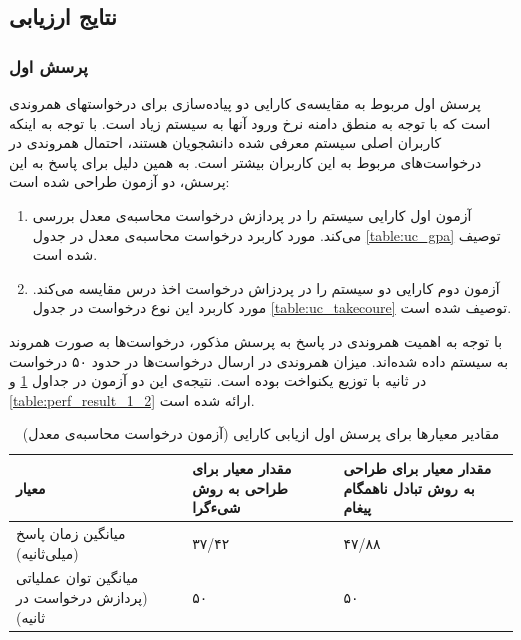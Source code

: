 \subsection{نتایج ارزیابی}
\subsubsection{پرسش اول}
پرسش اول مربوط به مقایسه‌ی  کارایی دو پیاده‌سازی برای درخواستهای همروندی است که با توجه به منطق دامنه نرخ ورود آنها به سیستم زیاد است. با توجه به اینکه کاربران اصلی سیستم معرفی شده دانشجویان هستند، احتمال همروندی در درخواست‌های مربوط به این کاربران بیشتر است. به همین دلیل برای پاسخ به این پرسش، دو آزمون طراحی شده است:
\begin{enumerate}
\item آزمون اول کارایی سیستم را در پردازش درخواست محاسبه‌ی معدل بررسی می‌کند. مورد کاربرد درخواست محاسبه‌ی معدل در جدول \ref{table:uc_gpa} توصیف شده است.
\item  آزمون دوم کارایی دو سیستم را در پردزاش درخواست اخذ درس مقایسه می‌کند. مورد کاربرد این نوع درخواست در جدول \ref{table:uc_takecoure} توصیف شده است. 
\end{enumerate}
با توجه به اهمیت همروندی در پاسخ به پرسش مذکور، درخواست‌ها به صورت همروند به سیستم داده شده‌اند. میزان همروندی در ارسال درخواست‌ها در حدود ۵۰ درخواست در ثانیه با توزیع یکنواخت بوده است. نتیجه‌ی این دو آزمون در جداول \ref{table:perf_result_1_1} و \ref{table:perf_result_1_2} ارائه شده است. 





\begin{table}[ht]
\small
\begin{center}
\begin{tabular}{|p{7cm}|p{4cm}|p{4cm}|}
	\hline
\textbf{معیار} & \textbf{مقدار معیار برای طراحی به روش شیءگرا} & \textbf{مقدار معیار برای طراحی به روش تبادل ناهمگام پیغام} 
\\ 
	\hline
	میانگین زمان پاسخ (میلی‌ثانیه)
	 &
	 ۳۷/۴۲
	 &
 ۴۷/۸۸ 
\\
	\hline
	میانگین توان عملیاتی (پردازش درخواست در ثانیه)
	 &
	 ۵۰
	 &
	 ۵۰
\\
	\hline

\end{tabular}
\caption{\label{table:perf_result_1_1} مقادیر معیارها برای پرسش اول ازیابی کارایی (آزمون درخواست محاسبه‌ی معدل)}
\end{center}
\end{table}

